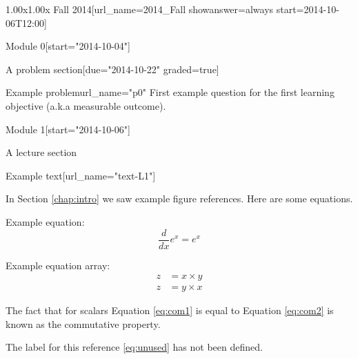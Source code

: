 \documentclass[12pt]{article}
\begin{document}
\begin{edXcourse}{1.00x}{1.00x Fall 2014}[url_name=2014_Fall showanswer=always start=2014-10-06T12:00]
\begin{edXchapter*}{Module 0}[start="2014-10-04"]
\begin{edXsequential}{A problem section}[due="2014-10-22" graded=true]
\begin{edXproblem}{Example problem}{url_name="p0"}
First example question for the first learning objective (a.k.a measurable outcome).

\end{edXproblem}

\end{edXsequential}

\end{edXchapter*}

\begin{edXchapter}{Module 1}[start="2014-10-06"]

\begin{edXsequential}{A lecture section}

\begin{edXtext}{Example text}[url_name="text-L1"]
 

In Section \ref{chap:intro} we saw example figure references.  Here are some equations.

Example equation:
\begin{equation}
  \frac{d}{dx} e^x = e^x
  \label{eq:deriv}
\end{equation}

Example equation array:
\begin{eqnarray}
  z & = x \times y \label{eq:com1}\\
  z & = y \times x \label{eq:com2}
\end{eqnarray}

The fact that for scalars Equation \ref{eq:com1} is equal to Equation \ref{eq:com2} is known as the commutative property.

The label for this reference \ref{eq:unused} has not been defined.

\end{edXtext}

\end{edXsequential}

\end{edXchapter}

\end{edXcourse}
\end{document}
